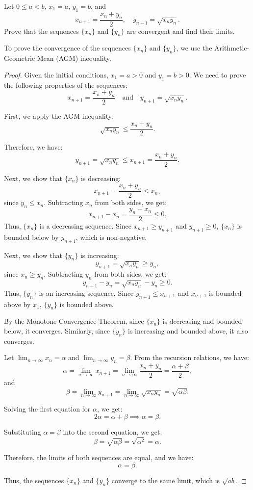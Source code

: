 \begin{exercise}
Let $0 \leq a < b$, $x_1 = a$, $y_1 = b$, and
\[
x_{n+1} = \frac{x_n + y_n}{2}, \quad y_{n+1} = \sqrt{x_n y_n}.
\]
Prove that the sequences $\{x_n\}$ and $\{y_n\}$ are convergent and find their limits.
\end{exercise}
\begin{solution}
To prove the convergence of the sequences $\{x_n\}$ and $\{y_n\}$, we use the Arithmetic-Geometric Mean (AGM) inequality.

\begin{proof}
Given the initial conditions, $x_1 = a > 0$ and $y_1 = b > 0$. We need to prove the following properties of the sequences:
\[
x_{n+1} = \frac{x_n + y_n}{2} \quad \text{and} \quad y_{n+1} = \sqrt{x_n y_n}.
\]

First, we apply the AGM inequality:
\[
\sqrt{x_n y_n} \leq \frac{x_n + y_n}{2}.
\]

Therefore, we have:
\[
y_{n+1} = \sqrt{x_n y_n} \leq x_{n+1} = \frac{x_n + y_n}{2}.
\]

Next, we show that $\{x_n\}$ is decreasing:
\[
x_{n+1} = \frac{x_n + y_n}{2} \leq x_n,
\]
since $y_n \leq x_n$. Subtracting $x_n$ from both sides, we get:
\[
x_{n+1} - x_n = \frac{y_n - x_n}{2} \leq 0.
\]
Thus, $\{x_n\}$ is a decreasing sequence. Since $x_{n+1} \geq y_{n+1}$ and $y_{n+1} \geq 0$, $\{x_n\}$ is bounded below by $y_{n+1}$, which is non-negative.

Next, we show that $\{y_n\}$ is increasing:
\[
y_{n+1} = \sqrt{x_n y_n} \geq y_n,
\]
since $x_n \geq y_n$. Subtracting $y_n$ from both sides, we get:
\[
y_{n+1} - y_n = \sqrt{x_n y_n} - y_n \geq 0.
\]
Thus, $\{y_n\}$ is an increasing sequence. Since $y_{n+1} \leq x_{n+1}$ and $x_{n+1}$ is bounded above by $x_1$, $\{y_n\}$ is bounded above.

By the Monotone Convergence Theorem, since $\{x_n\}$ is decreasing and bounded below, it converges. Similarly, since $\{y_n\}$ is increasing and bounded above, it also converges.

Let $\lim_{n \to \infty} x_n = \alpha$ and $\lim_{n \to \infty} y_n = \beta$. From the recursion relations, we have:
\[
\alpha = \lim_{n \to \infty} x_{n+1} = \lim_{n \to \infty} \frac{x_n + y_n}{2} = \frac{\alpha + \beta}{2},
\]
and
\[
\beta = \lim_{n \to \infty} y_{n+1} = \lim_{n \to \infty} \sqrt{x_n y_n} = \sqrt{\alpha \beta}.
\]

Solving the first equation for $\alpha$, we get:
\[
2\alpha = \alpha + \beta \implies \alpha = \beta.
\]

Substituting $\alpha = \beta$ into the second equation, we get:
\[
\beta = \sqrt{\alpha \beta} = \sqrt{\alpha^2} = \alpha.
\]

Therefore, the limits of both sequences are equal, and we have:
\[
\alpha = \beta.
\]

Thus, the sequences $\{x_n\}$ and $\{y_n\}$ converge to the same limit, which is $\sqrt{ab}$.
\end{proof}
\end{solution}


